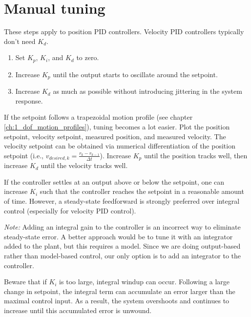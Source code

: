 \section{Manual tuning}

These steps apply to position PID controllers. Velocity PID controllers
typically don't need $K_d$.

\begin{enumerate}
  \item Set $K_p$, $K_i$, and $K_d$ to zero.
  \item Increase $K_p$ until the \gls{output} starts to oscillate around the
    \gls{setpoint}.
  \item Increase $K_d$ as much as possible without introducing jittering in the
    \gls{system response}.
\end{enumerate}

If the \gls{setpoint} follows a trapezoidal motion profile (see chapter
\ref{ch:1_dof_motion_profiles}), tuning becomes a lot easier. Plot the position
\gls{setpoint}, velocity \gls{setpoint}, measured position, and measured
velocity. The velocity \gls{setpoint} can be obtained via numerical
differentiation of the position \gls{setpoint} (i.e.,
$v_{desired,k} = \frac{r_k - r_{k-1}}{\Delta t}$). Increase $K_p$ until the
position tracks well, then increase $K_d$ until the velocity tracks well.

If the \gls{controller} settles at an \gls{output} above or below the
\gls{setpoint}, one can increase $K_i$ such that the \gls{controller} reaches
the \gls{setpoint} in a reasonable amount of time. However, a steady-state
feedforward is strongly preferred over integral control (especially for velocity
PID control).

\begin{remark}
  \textit{Note:} Adding an integral gain to the \gls{controller} is an incorrect
  way to eliminate \gls{steady-state error}. A better approach would be to tune
  it with an integrator added to the \gls{plant}, but this requires a
  \gls{model}. Since we are doing output-based rather than model-based control,
  our only option is to add an integrator to the \gls{controller}.
\end{remark}

Beware that if $K_i$ is too large, integral windup can occur. Following a large
change in \gls{setpoint}, the integral term can accumulate an error larger than
the maximal \gls{control input}. As a result, the system overshoots and
continues to increase until this accumulated error is unwound.
